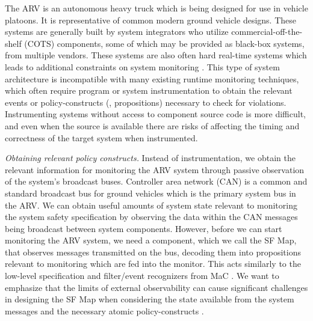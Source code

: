 The ARV is an autonomous heavy truck which is being designed for use in vehicle platoons. It is representative of common modern ground vehicle designs. These systems are generally built by system integrators who utilize commercial-off-the-shelf (COTS) components, some of which may be provided as black-box systems, from multiple vendors.
These systems are also often hard real-time systems which leads to additional constraints on system monitoring \cite{Goodloe2010}. 
This type of system architecture is incompatible with many existing runtime monitoring techniques, which often require program or system instrumentation \cite{Havelund2004, Chen2003, Bonakdarpour2012,Kim2004} to obtain the relevant events or policy-constructs (\eg, propositions) necessary to check for violations. 
Instrumenting systems without access to component source code is more difficult, and even when the source is available there are risks of affecting the timing and correctness of the target system when instrumented.

\textit{Obtaining relevant policy constructs.}
Instead of instrumentation, we obtain the relevant information for monitoring the ARV system through passive observation of the system's broadcast buses. %
Controller area network (CAN) is a common and standard broadcast bus for ground vehicles which is the primary system bus in the ARV. We can obtain useful amounts of system state relevant to monitoring the system safety specification by observing the data within the CAN messages being broadcast between system components.
However, before we can start monitoring the ARV system, we need a component, which we call the \textsf{SF Map}, that observes messages transmitted on the bus, decoding them into propositions relevant to monitoring which are fed into the monitor. 
This acts similarly to the low-level specification and filter/event recognizers from MaC \cite{Kim2004}.
We want to emphasize that the limits of external observability can cause significant challenges  in designing the \textsf{SF Map} when considering the state available from the system messages and the necessary atomic policy-constructs \cite{Kane2014}.

